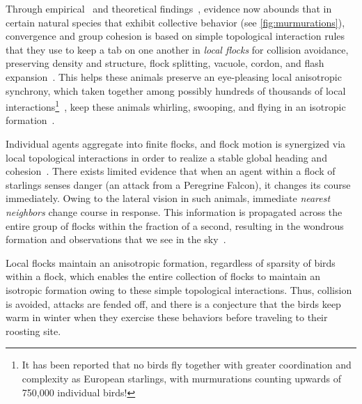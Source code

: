 %
Through empirical~\cite{Ballerini1232, Cavagna2010Scale, Bialek2012Statistical} and theoretical findings~\cite{JadbabaieCoord}, evidence now abounds that in certain natural species that exhibit collective behavior (see \autoref{fig:murmurations}), convergence and group cohesion is based on simple topological interaction rules that they use to keep a tab on one another in \textit{local flocks} for collision avoidance, preserving density and structure, flock splitting, vacuole, cordon, and flash expansion~\cite{NatGeo}. This helps these animals preserve an eye-pleasing local anisotropic synchrony, which taken together among possibly hundreds of thousands of local interactions\footnote{It has been reported that no birds fly together with greater coordination and complexity as European starlings, with murmurations counting upwards of 750,000 individual birds!}~\cite{NatGeo}, keep these animals whirling, swooping, and flying in an isotropic formation~\cite{Ballerini1232}. 

Individual agents aggregate into finite flocks, and flock motion is synergized via local topological interactions in order to realize a stable global heading and cohesion~\cite{JadbabaieCoord}. There exists limited evidence that when an agent within a flock of starlings senses danger (\eg an attack from a Peregrine Falcon), it changes its course immediately. Owing to the lateral vision in such animals, immediate \textit{nearest neighbors} change course in response. This information is propagated across the entire group of flocks within the fraction of a second, resulting in the wondrous formation and observations  that we see in the sky~\cite{Ballerini1232}. 

Local flocks maintain an anisotropic formation, regardless of sparsity of birds within a flock, which enables the entire collection of flocks to maintain an isotropic formation owing to these simple topological interactions. Thus, collision is avoided, attacks are fended off, and there is a conjecture that the birds keep warm in winter when they exercise these  behaviors before traveling to their roosting site. %
%


